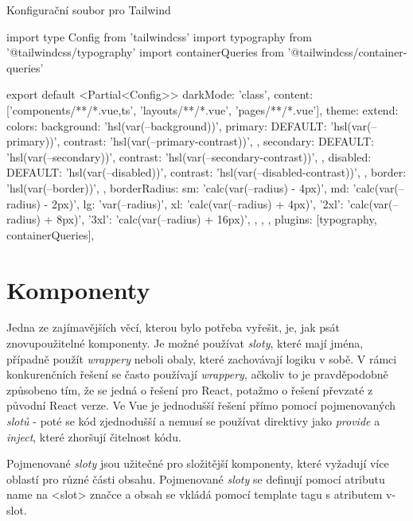 \begin{listing}[h]
    \caption{Konfigurační soubor pro Tailwind}
    \label{lst:tailwind-config}
    \begin{code}
import type { Config } from 'tailwindcss'
import typography from '@tailwindcss/typography'
import containerQueries from '@tailwindcss/container-queries'

export default <Partial<Config>>{
    darkMode: 'class',
    content: ['components/**/*.{vue,ts}', 'layouts/**/*.vue', 'pages/**/*.vue'],
    theme: {
        extend: {
            colors: {
                background: 'hsl(var(--background))',
                primary: {
                    DEFAULT: 'hsl(var(--primary))',
                    contrast: 'hsl(var(--primary-contrast))',
                },
                secondary: {
                    DEFAULT: 'hsl(var(--secondary))',
                    contrast: 'hsl(var(--secondary-contrast))',
                },
                disabled: {
                    DEFAULT: 'hsl(var(--disabled))',
                    contrast: 'hsl(var(--disabled-contrast))',
                },
                border: 'hsl(var(--border))',
            },
            borderRadius: {
                sm: 'calc(var(--radius) - 4px)',
                md: 'calc(var(--radius) - 2px)',
                lg: 'var(--radius)',
                xl: 'calc(var(--radius) + 4px)',
                '2xl': 'calc(var(--radius) + 8px)',
                '3xl': 'calc(var(--radius) + 16px)',
            },
        },
    },
    plugins: [typography, containerQueries],
}
\end{code}
\end{listing}

\section{Komponenty}
Jedna ze zajímavějších věcí, kterou bylo potřeba vyřešit, je, jak psát znovupoužitelné komponenty. Je možné používat \emph{sloty}, které mají jména, případně použít \emph{wrappery} neboli obaly, které zachovávají logiku v sobě. V rámci konkurenčních řešení se často používají \emph{wrappery}, ačkoliv to je pravděpodobně způsobeno tím, že se jedná o řešení pro React, potažmo o řešení převzaté z původní React verze. Ve Vue je jednodušší řešení přímo pomocí pojmenovaných \emph{slotů} - poté se kód zjednodušší a nemusí se používat direktivy jako \emph{provide} a \emph{inject}, které zhoršují čitelnost kódu.

Pojmenované \emph{sloty} jsou užitečné pro složitější komponenty, které vyžadují více oblastí pro různé části obsahu. Pojmenované \emph{sloty} se definují pomocí atributu name na <slot> značce a obsah se vkládá pomocí template tagu s atributem v-slot.

